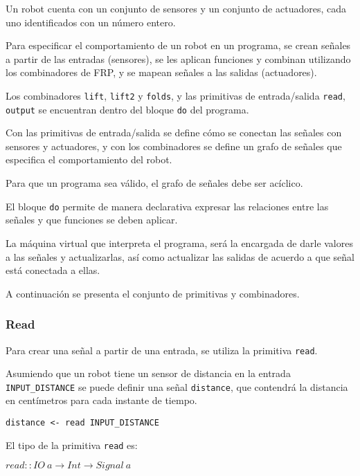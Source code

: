 
  Un robot cuenta con un conjunto de sensores y un conjunto de actuadores,
cada uno identificados con un número entero.

  Para especificar el comportamiento de un robot en un programa, se crean
señales a partir de las entradas (sensores), se les aplican funciones
y combinan utilizando los combinadores de FRP, y se mapean señales
a las salidas (actuadores).

  Los combinadores \texttt{lift}, \texttt{lift2} y \texttt{folds},
y las primitivas de entrada/salida \texttt{read}, \texttt{output} se
encuentran dentro del bloque \texttt{do} del programa.

  Con las primitivas de entrada/salida se define cómo se conectan
las señales con sensores y actuadores, y con los combinadores se
define un grafo de señales que especifica el comportamiento del robot.
  
  Para que un programa sea válido, el grafo de señales debe ser acíclico.

  El bloque \texttt{do} permite de manera declarativa expresar las
relaciones entre las señales y que funciones se deben aplicar.

  La máquina virtual que interpreta el programa, será la encargada de
darle valores a las señales y actualizarlas, así como actualizar las
salidas de acuerdo a que señal está conectada a ellas.

  A continuación se presenta el conjunto de primitivas y combinadores.

\subsubsection{Read}
  Para crear una señal a partir de una entrada, se utiliza la
primitiva \texttt{read}.

  Asumiendo que un robot tiene un sensor de distancia en la entrada
\texttt{INPUT\_DISTANCE} se puede definir una señal \texttt{distance},
que contendrá la distancia en centímetros para cada instante de tiempo.

\begin{center}
\begin{Verbatim}[frame=single]
distance <- read INPUT_DISTANCE
\end{Verbatim}
\end{center}

El tipo de la primitiva \texttt{read} es:

\begin{center}
  $read :: IO\ a \rightarrow Int \rightarrow Signal\ a $
\end{center}

